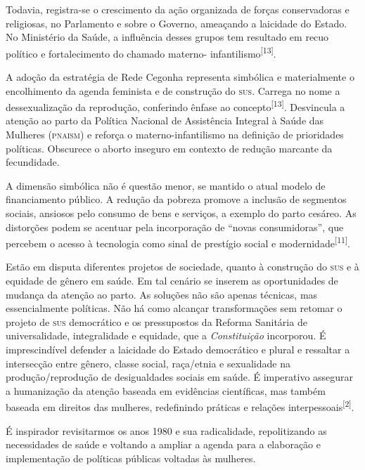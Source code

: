 \documentclass{article}
\begin{document}
Todavia, registra-se o crescimento da ação organizada de forças conservadoras e
religiosas, no Parlamento e sobre o Governo, ameaçando a laicidade do Estado. No
Ministério da Saúde, a influência desses grupos tem resultado em recuo político
e
fortalecimento do chamado materno- infantilismo\textsuperscript{[}\textsuperscript{13}\textsuperscript{]}.

A adoção da estratégia de Rede Cegonha representa simbólica e materialmente o
encolhimento da agenda feminista e de construção do \textsc{sus}. Carrega no nome a
dessexualização da reprodução, conferindo ênfase ao concepto\textsuperscript{[}\textsuperscript{13}\textsuperscript{]}. Desvincula a atenção ao parto da Política Nacional
de Assistência Integral à Saúde das Mulheres (\textsc{pnaism}) e reforça o
materno-infantilismo
na definição de prioridades políticas. Obscurece o aborto inseguro em contexto
de
redução marcante da fecundidade.

A dimensão simbólica não é questão menor, se mantido o atual modelo de
financiamento
público. A redução da pobreza promove a inclusão de segmentos sociais, ansiosos
pelo
consumo de bens e serviços, a exemplo do parto cesáreo. As distorções podem se
acentuar
pela incorporação de “novas consumidoras”, que percebem o acesso à tecnologia
como sinal
de prestígio social e modernidade\textsuperscript{[}\textsuperscript{11}\textsuperscript{]}.

Estão em disputa diferentes projetos de sociedade, quanto à construção do \textsc{sus} e
à
equidade de gênero em saúde. Em tal cenário se inserem as oportunidades de
mudança da
atenção ao parto. As soluções não são apenas técnicas, mas essencialmente
políticas. Não
há como alcançar transformações sem retomar o projeto de \textsc{sus} democrático e os
pressupostos da Reforma Sanitária de universalidade, integralidade e equidade,
que a
\textit{Constituição}
incorporou. É imprescindível defender a laicidade do
Estado democrático e plural e ressaltar a intersecção entre gênero, classe
social,
raça/etnia e sexualidade na produção/reprodução de desigualdades sociais em
saúde. É
imperativo assegurar a humanização da atenção baseada em evidências científicas,
mas
também baseada em direitos das mulheres, redefinindo práticas e relações
interpessoais\textsuperscript{[}\textsuperscript{2}\textsuperscript{]}.

É inspirador revisitarmos os anos 1980 e sua radicalidade, repolitizando as
necessidades
de saúde e voltando a ampliar a agenda para a elaboração e implementação de
políticas
públicas voltadas às mulheres.
\end{document}
